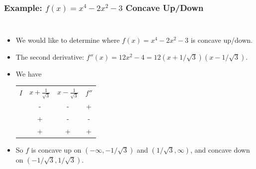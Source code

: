 \documentclass[serif,ignorenonframetext]{beamer}
\begin{document}
\begin{frame}
  \frametitle{Example: $f(x)=x^4-2x^2-3$ Concave Up/Down}
  \begin{columns}
  \begin{itemize}[<+->]
  \item We would like to determine where
    $f(x)=x^4-2x^2-3$ is concave up/down.
  \item The second derivative: 
    $f''(x)=12x^2-4=12(x+1/\sqrt{3})(x-1/\sqrt{3})$.
  \item We have
    \begin{center}
    \begin{tabular}{lccc}
      $I$ & $x+\frac{1}{\sqrt{3}}$ & $x-\frac{1}{\sqrt{3}}$ & $f''$ \\
      \uncover<+->{$(-\infty,-\frac{1}{\sqrt{3}})$    & - & -              & +     \\}%
      \uncover<+->{$(-\frac{1}{\sqrt{3}},\frac{1}{\sqrt{3}})$ & + & -              & -     \\}%
      \uncover<+->{$(\frac{1}{\sqrt{3}},\infty)$      & + & +              & +       }%
    \end{tabular}
    \end{center}
  \item So $f$ is concave up on $(-\infty,-1/\sqrt{3})$ and 
    $(1/\sqrt{3},\infty)$, and concave down on $(-1/\sqrt{3},1/\sqrt{3})$.
  \end{itemize}

\end{columns}
\end{frame}
\end{document}
